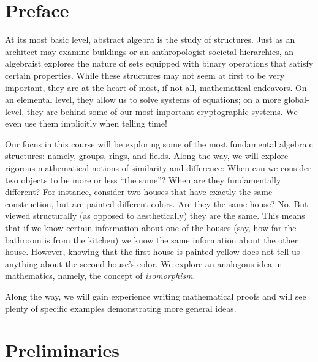 \documentclass[10pt,]{book}
\theoremstyle{plain}
\theoremstyle{definition}
\theoremstyle{definition}
\theoremstyle{definition}
\theoremstyle{definition}
\numberwithin{equation}{section}
\begin{document}
\chapter*{Preface}\label{preface-1}
At its most basic level, abstract algebra is the study of structures. Just as an architect may examine buildings or an anthropologist societal hierarchies, an algebraist explores the nature of sets equipped with binary operations that satisfy certain properties. While these structures may not seem at first to be very important, they are at the heart of most, if not all, mathematical endeavors. On an elemental level, they allow us to solve systems of equations; on a more global-level, they are behind some of our most important cryptographic systems. We even use them implicitly when telling time!%
\par
Our focus in this course will be exploring some of the most fundamental algebraic structures: namely, groups, rings, and fields. Along the way, we will explore rigorous mathematical notions of similarity and difference: When can we consider two objects to be more or less ``the same''? When are they fundamentally different? For instance, consider two houses that have exactly the same construction, but are painted different colors. Are they the same house? No. But viewed structurally (as opposed to aesthetically) they are the same. This means that if we know certain information about one of the houses (say, how far the bathroom is from the kitchen) we know the same information about the other house. However, knowing that the first house is painted yellow does not tell us anything about the second house's color. We explore an analogous idea in mathematics, namely, the concept of \emph{isomorphism}.%
\par
Along the way, we will gain experience writing mathematical proofs and will see plenty of specific examples demonstrating more general ideas.%
\setcounter{tocdepth}{1}
\renewcommand*\contentsname{Contents}
\tableofcontents
\mainmatter
\typeout{************************************************}
\typeout{************************************************}
\chapter[{Preliminaries}]{Preliminaries}\label{pre}
\typeout{************************************************}
\typeout{************************************************}
\end{document}

